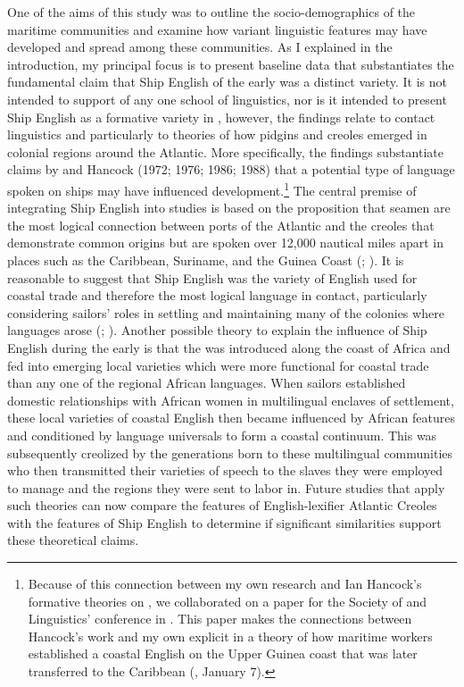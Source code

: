 One of the aims of this study was to outline the socio-demographics of the maritime communities and examine how variant linguistic features may have developed and spread among these communities. As I explained in the introduction, my principal focus is to present baseline data that substantiates the fundamental claim that Ship English of the early  was a distinct variety. It is not intended to support of any one school of  linguistics, nor is it intended to present Ship English as a formative variety in , however, the findings relate to contact linguistics and particularly to theories of how pidgins and creoles emerged in colonial regions around the Atlantic. More specifically, the findings substantiate claims by \citet{Reinecke1938} and Hancock (1972; 1976; 1986; 1988) that a potential type of language spoken on ships may have influenced  development.\footnote{Because of this connection between my own research and Ian Hancock’s formative theories on , we collaborated on a paper for the Society of  and  Linguistics’ conference in \citealt{January2017}. This paper makes the connections between Hancock’s work and my own explicit in a theory of how maritime workers established a coastal English on the Upper Guinea coast that was later transferred to the Caribbean (\citealt{DelgadoHancock2017}, January 7).} The central premise of integrating Ship English into  studies is based on the proposition that seamen are the most logical connection between ports of the Atlantic and the creoles that demonstrate common origins but are spoken over 12,000 nautical miles apart in places such as the Caribbean, Suriname, and the Guinea Coast (\citealt{Hancock1976}; \citealt{FaraclasEtAl2012}). It is reasonable to suggest that Ship English was the variety of English used for coastal trade and therefore the most logical language in contact, particularly considering sailors’ roles in settling and maintaining many of the colonies where  languages arose (\citealt{BaileyRoss1988}; \citealt{Holm1988}). Another possible theory to explain the influence of Ship English during the early  is that the  was introduced along the coast of Africa and fed into emerging local varieties which were more functional for coastal trade than any one of the regional African languages. When sailors established domestic relationships with African women in multilingual enclaves of settlement, these local varieties of coastal English then became influenced by African features and conditioned by language universals to form a coastal  continuum. This  was subsequently creolized by the generations born to these multilingual communities who then transmitted their varieties of speech to the slaves they were employed to manage and the regions they were sent to labor in. Future studies that apply such theories can now compare the features of English-lexifier Atlantic Creoles with the features of Ship English to determine if significant similarities support these theoretical claims. 

